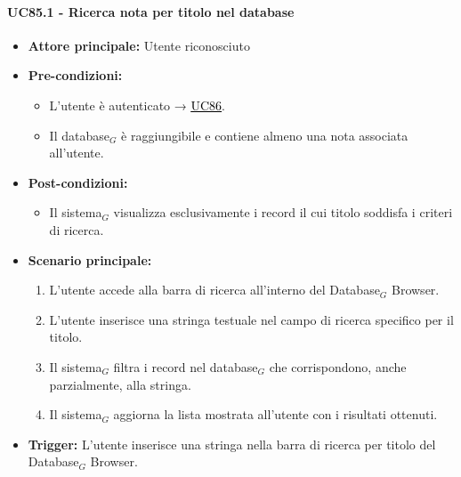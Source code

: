 \documentclass[a4paper, 10pt]{article}
\newcommand{\uclink}[2]{\hyperlink{#1}{\textcolor{black}{\underline{#2}}}}
\begin{document}
\paragraph{UC85.1 - Ricerca nota per titolo nel database}
\hypertarget{uc:85.1}{}
\begin{itemize}
    \item \textbf{Attore principale:} Utente riconosciuto
    \item \textbf{Pre-condizioni:} 
        \begin{itemize}
            \item L'utente è autenticato → \uclink{uc:86}{UC86}.
            \item Il database$_G$ è raggiungibile e contiene almeno una nota associata all'utente.
        \end{itemize}
    \item \textbf{Post-condizioni:} 
        \begin{itemize}
            \item Il sistema$_G$ visualizza esclusivamente i record il cui titolo soddisfa i criteri di ricerca.
        \end{itemize}
    \item \textbf{Scenario principale:}
        \begin{enumerate}
            \item L'utente accede alla barra di ricerca all'interno del Database$_G$ Browser.
            \item L'utente inserisce una stringa testuale nel campo di ricerca specifico per il titolo.
            \item Il sistema$_G$ filtra i record nel database$_G$ che corrispondono, anche parzialmente, alla stringa.
            \item Il sistema$_G$ aggiorna la lista mostrata all'utente con i risultati ottenuti.
        \end{enumerate}
    \item \textbf{Trigger:} L'utente inserisce una stringa nella barra di ricerca per titolo del Database$_G$ Browser.
\end{itemize}
\end{document}
